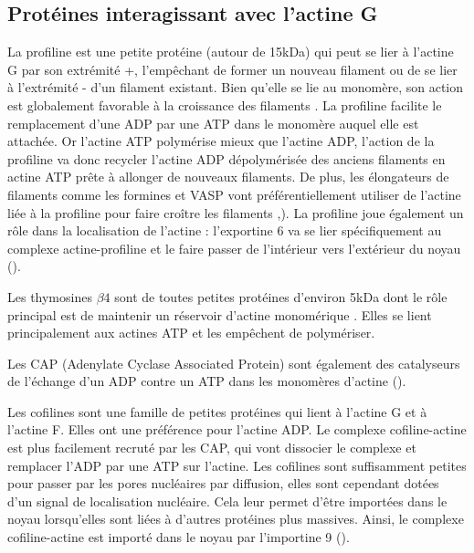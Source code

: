 \subsection{Protéines interagissant avec l'actine G}

 La profiline est une petite protéine (autour de 15kDa) qui peut se lier à l'actine G par son extrémité +, l'empêchant de former un nouveau filament ou de se lier à l'extrémité - d'un filament existant. 
Bien qu'elle se lie au monomère, son action est globalement favorable à la croissance des filaments \cite{pollard_quantitative_1984}. 
La profiline facilite le remplacement d'une ADP par une ATP dans le monomère auquel elle est attachée. 
Or l'actine ATP polymérise mieux que l'actine ADP, l'action de la profiline va donc recycler l'actine ADP dépolymérisée des anciens filaments en actine ATP prête à allonger de nouveaux filaments. 
De plus, les élongateurs de filaments comme les formines et VASP vont préférentiellement utiliser de l'actine liée à la profiline pour faire croître les filaments \cite{ferron_structural_2007},\cite{romero_formin_2004}). 
La profiline joue également un rôle dans la localisation de l'actine : l'exportine 6 va se lier spécifiquement au complexe actine-profiline et le faire passer de l'intérieur vers l'extérieur du noyau (\cite{dopie_active_2012}).


Les thymosines $\beta 4$ sont de toutes petites protéines d'environ 5kDa dont le rôle principal est de maintenir un réservoir d'actine monomérique \cite{safer_isolation_1990}. Elles se lient principalement aux actines ATP et les empêchent de polymériser. 

Les CAP (Adenylate Cyclase Associated Protein) sont également des catalyseurs de l'échange d'un ADP contre un ATP dans les monomères d'actine (\cite{makkonen_mammalian_2013}). 

Les cofilines sont une famille de petites protéines qui lient à l'actine G et à l'actine F. Elles ont une préférence pour l'actine ADP. 
Le complexe cofiline-actine est plus facilement recruté par les CAP, qui vont  dissocier le complexe et remplacer l'ADP par une ATP sur l'actine. 
Les cofilines sont suffisamment petites pour passer par les pores nucléaires par diffusion, elles sont cependant dotées d'un signal de localisation nucléaire. Cela leur permet d'être importées dans le noyau lorsqu'elles sont liées à d'autres protéines plus massives. 
Ainsi, le complexe cofiline-actine est importé dans le noyau par l'importine 9 (\cite{dopie_active_2012}).

